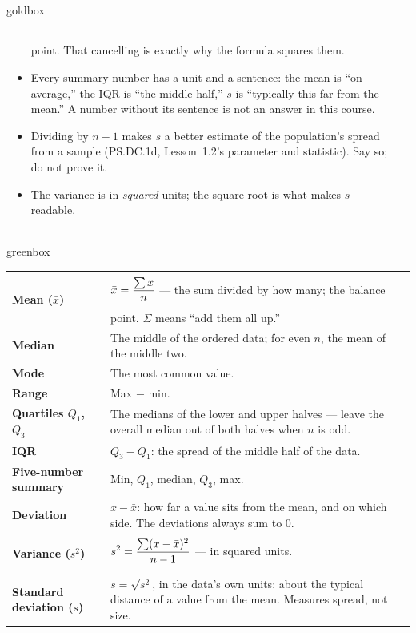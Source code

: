 \documentclass[10pt]{article}
\newcommand{\TallMath}[1]{$\displaystyle #1\rule[-1.4em]{0pt}{3.2em}$}
\begin{document}
\begin{skillbox}{goldbox}
\begin{tabularx}{\linewidth}{@{}X|X@{}}
\begin{itemize}[leftmargin=1.1em, nosep, after=\vspace{2pt}]
        point. That cancelling is exactly why the formula squares them.
  \item Every summary number has a unit and a sentence: the mean is ``on average,'' the IQR is
        ``the middle half,'' $s$ is ``typically this far from the mean.'' A number without its
        sentence is not an answer in this course.
  \item Dividing by $n - 1$ makes $s$ a better estimate of the population's spread from a
        sample (PS.DC.1d, Lesson~1.2's parameter and statistic). Say so; do not prove it.
  \item The variance is in \emph{squared} units; the square root is what makes $s$ readable.
\end{itemize}
\end{tabularx}
\end{skillbox}

\boxguard[24]
\begin{skillbox}{greenbox}
\small
\renewcommand{\arraystretch}{1.35}
\begin{tabularx}{\linewidth}{@{} >{\bfseries}p{3.4cm} X @{}}
Mean ($\bar{x}$) & \TallMath{\bar{x} = \frac{\sum x}{n}} --- the sum divided by how many; the
       balance point. $\Sigma$ means ``add them all up.'' \\
Median & The middle of the ordered data; for even $n$, the mean of the middle two. \\
Mode & The most common value. \\
Range & Max $-$ min. \\
Quartiles $Q_1$, $Q_3$ & The medians of the lower and upper halves --- leave the overall median
       out of both halves when $n$ is odd. \\
IQR & $Q_3 - Q_1$: the spread of the middle half of the data. \\
Five-number summary & Min, $Q_1$, median, $Q_3$, max. \\
Deviation & $x - \bar{x}$: how far a value sits from the mean, and on which side. The deviations
       always sum to $0$. \\
Variance ($s^2$) & \TallMath{s^2 = \frac{\sum (x - \bar{x})^2}{n - 1}} --- in squared units. \\
Standard deviation ($s$) & $s = \sqrt{s^2}$, in the data's own units: about the typical
       distance of a value from the mean. Measures spread, not size. \\
\end{tabularx}
\end{skillbox}
\end{document}
